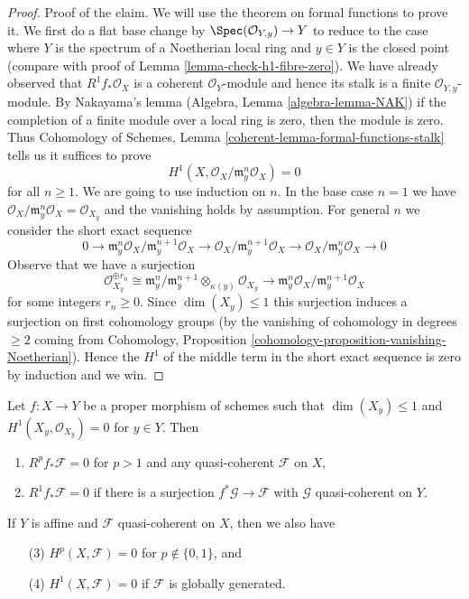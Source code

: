 \begin{proof}
\medskip\noindent
Proof of the claim. We will use the theorem on formal functions to
prove it. We first do a flat base change by $\Spec(\mathcal{O}_{Y, y}) \to Y$
to reduce to the case where $Y$ is the spectrum of a Noetherian local
ring and $y \in Y$ is the closed point (compare with proof of
Lemma \ref{lemma-check-h1-fibre-zero}).
We have already observed that $R^1f_*\mathcal{O}_X$ is a coherent
$\mathcal{O}_Y$-module and hence its stalk is a finite
$\mathcal{O}_{Y, y}$-module. By Nakayama's lemma
(Algebra, Lemma \ref{algebra-lemma-NAK})
if the completion of a finite module over a local ring
is zero, then the module is zero. Thus
Cohomology of Schemes, Lemma \ref{coherent-lemma-formal-functions-stalk}
tells us it suffices to prove
$$
H^1(X, \mathcal{O}_X/\mathfrak m_y^n \mathcal{O}_X) = 0
$$
for all $n \geq 1$. We are going to use induction on $n$.
In the base case $n = 1$ we have
$\mathcal{O}_X/\mathfrak m_y^n \mathcal{O}_X = \mathcal{O}_{X_y}$
and the vanishing holds by assumption.
For general $n$ we consider the short exact sequence
$$
0 \to \mathfrak m_y^n\mathcal{O}_X/\mathfrak m_y^{n + 1}\mathcal{O}_X
\to \mathcal{O}_X/\mathfrak m_y^{n + 1}\mathcal{O}_X \to
\mathcal{O}_X/\mathfrak m_y^n \mathcal{O}_X \to 0
$$
Observe that we have a surjection
$$
\mathcal{O}_{X_y}^{\oplus r_n} \cong
\mathfrak m_y^n/\mathfrak m_y^{n + 1} \otimes_{\kappa(y)} \mathcal{O}_{X_y}
\longrightarrow
\mathfrak m_y^n\mathcal{O}_X/\mathfrak m_y^{n + 1}\mathcal{O}_X
$$
for some integers $r_n \geq 0$.
Since $\dim(X_y) \leq 1$ this surjection induces a surjection
on first cohomology groups (by the vanishing of cohomology in degrees $\geq 2$
coming from Cohomology, Proposition
\ref{cohomology-proposition-vanishing-Noetherian}).
Hence the $H^1$ of the middle term in the short exact sequence is zero
by induction and we win.
\end{proof}

\begin{lemma}
\label{lemma-globally-generated-vanishing}
Let $f : X \to Y$ be a proper morphism of schemes such
that $\dim(X_y) \leq 1$ and $H^1(X_y, \mathcal{O}_{X_y}) = 0$
for $y \in Y$. Then
\begin{enumerate}
\item $R^pf_*\mathcal{F} = 0$ for $p > 1$ and
any quasi-coherent $\mathcal{F}$ on $X$,
\item $R^1f_*\mathcal{F} = 0$ if there is a surjection
$f^*\mathcal{G} \to \mathcal{F}$ with $\mathcal{G}$ quasi-coherent
on $Y$.
\end{enumerate}
If $Y$ is affine and $\mathcal{F}$ quasi-coherent on $X$, then we also have
\begin{enumerate}
\item[(3)] $H^p(X, \mathcal{F}) = 0$ for $p \not \in \{0, 1\}$, and
\item[(4)] $H^1(X, \mathcal{F}) = 0$ if $\mathcal{F}$ is globally generated.
\end{enumerate}
\end{lemma}

